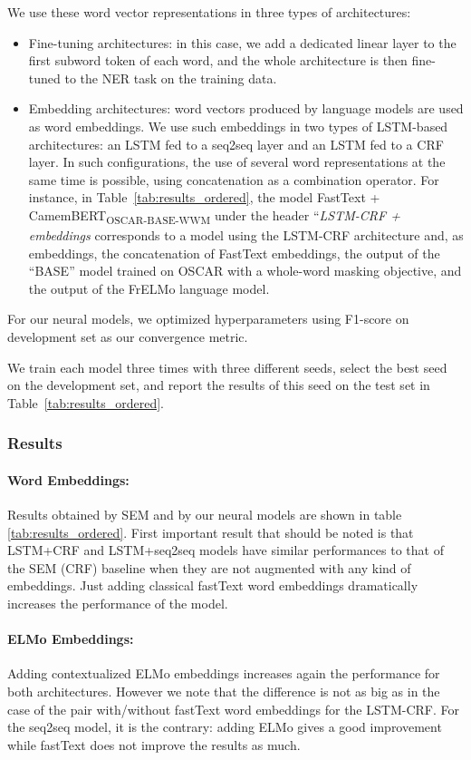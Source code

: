 We use these word vector representations in three types of architectures:
\begin{itemize}
    \item Fine-tuning architectures: in this case, we add a dedicated linear layer to the first subword token of each word, and the whole architecture is then fine-tuned to the NER task on the training data.
    \item Embedding architectures: word vectors produced by language models are used as word embeddings. We use such embeddings in two types of LSTM-based architectures: an LSTM fed to a seq2seq layer and an LSTM fed to a CRF layer. In such configurations, the use of several word representations at the same time is possible, using concatenation as a combination operator. For instance, in Table~\ref{tab:results_ordered}, the model FastText + CamemBERT\textsubscript{OSCAR-BASE-WWM} under the header ``\emph{LSTM-CRF + embeddings} corresponds to a model using the LSTM-CRF architecture and, as embeddings, the concatenation of FastText embeddings, the output of the \camembert ``BASE'' model trained on OSCAR with a whole-word masking objective, and the output of the FrELMo language model.
\end{itemize}

For our neural models, we optimized hyperparameters using F1-score on development set as our convergence metric.

We train each model three times with three different seeds, select the best seed on the development set, and report the results of this seed on the test set in Table~\ref{tab:results_ordered}.

\subsubsection{Results}

\paragraph{Word Embeddings:} Results obtained by SEM and by our neural models are shown in table \ref{tab:results_ordered}. First important result that should be noted is that LSTM+CRF and LSTM+seq2seq models have similar performances to that of the SEM (CRF) baseline when they are not augmented with any kind of embeddings. Just adding classical fastText word embeddings dramatically increases the performance of the model.

\paragraph{ELMo Embeddings:} Adding contextualized ELMo embeddings increases again the performance for both architectures. However we note that the difference is not as big as in the case of the pair with/without fastText word embeddings for the LSTM-CRF. For the seq2seq model, it is the contrary: adding ELMo gives a good improvement while fastText does not improve the results as much.

